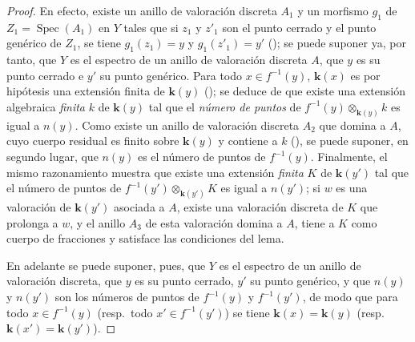 \begin{proof}
En efecto, existe un anillo de valoración discreta $A_1$ y un morfismo $g_1$ de $Z_1=\operatorname{Spec}(A_1)$ en $Y$ tales que si $z_1$ y $z'_1$ son el punto cerrado y el punto genérico de $Z_1$, 
se tiene $g_1(z_1)=y$ y $g_1(z'_1)=y'$ (); se puede suponer ya, por tanto, que $Y$ es el espectro de un anillo de valoración discreta $A$, que $y$ es su punto cerrado e $y'$ su punto genérico.
Para todo $x\in f^{-1}(y)$, $\boldsymbol{k}(x)$ es por hipótesis una extensión finita de $\boldsymbol{k}(y)$ (); se deduce de  que existe una extensión algebraica \emph{finita} $k$ de $\boldsymbol{k}(y)$ tal que el \emph{número de puntos} de $f^{-1}(y)\otimes_{\mathbf{k}(y)}k$ es igual a $n(y)$.
Como existe un anillo de valoración discreta $A_2$ que domina a $A$, cuyo cuerpo residual es finito sobre $\boldsymbol{k}(y)$ y contiene a $k$ (), se puede suponer, en segundo lugar, que $n(y)$ es el número de puntos de $f^{-1}(y)$.
Finalmente, el mismo razonamiento muestra que existe una extensión \emph{finita} $K$ de $\boldsymbol{k}(y')$ tal que el número de puntos de $f^{-1}(y')\otimes_{\mathbf{k}(y')}K$ es igual a $n(y')$; si $w$ es una valoración de $\boldsymbol{k}(y')$ asociada a $A$, existe una valoración discreta de $K$ que prolonga a $w$, y el anillo $A_3$ de esta valoración domina a $A$, tiene a $K$ como cuerpo de fracciones y satisface las condiciones del lema.

En adelante se puede suponer, pues, que $Y$ es el espectro de un anillo de valoración discreta, que $y$ es su punto cerrado, $y'$ su punto genérico, y que $n(y)$ y $n(y')$ son los números de puntos de $f^{-1}(y)$ y $f^{-1}(y')$, de modo que para todo $x\in f^{-1}(y)$ (resp.\ todo $x'\in f^{-1}(y')$) se tiene $\boldsymbol{k}(x)=\boldsymbol{k}(y)$ (resp.\ $\boldsymbol{k}(x')=\boldsymbol{k}(y')$).


\end{proof}
